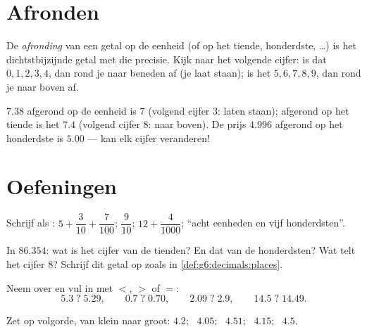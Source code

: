 \section{Afronden}

\begin{definition}[Afronden]\label{def:g6:decimals:rounding}
De \emph{afronding} van een getal op de eenheid (of op het
tiende, honderdste, \dots) is het dichtstbijzijnde getal met die precisie.
Kijk naar het volgende cijfer: is dat $0,1,2,3,4$, dan rond je naar beneden
af (je laat staan); is het $5,6,7,8,9$, dan rond je naar boven af.
\end{definition}

\begin{example}
$7.38$ afgerond op de eenheid is $7$ (volgend cijfer $3$: laten staan);
afgerond op het tiende is het $7.4$ (volgend cijfer $8$: naar boven). De prijs
$4.996$ afgerond op het honderdste is $5.00$ ---  kan elk cijfer
veranderen!
\end{example}

\section{Oefeningen}

\begin{exercise}[$\star$]\label{exo:g6:decimals:1}
Schrijf als : $5 + \dfrac{3}{10} + \dfrac{7}{100}$;
\quad $\dfrac{9}{10}$; \quad $12 + \dfrac{4}{1000}$;
\quad ``acht eenheden en vijf honderdsten''.
\end{exercise}

\begin{exercise}[$\star$]\label{exo:g6:decimals:2}
In $86.354$: wat is het cijfer van de tienden? En dat van de honderdsten? Wat
telt het cijfer $8$? Schrijf dit getal op zoals in
\cref{def:g6:decimals:places}.
\end{exercise}

\begin{exercise}[$\star$]\label{exo:g6:decimals:3}
Neem over en vul in met $<$, $>$ of $=$:
\[
5.3 \;?\; 5.29, \qquad
0.7 \;?\; 0.70, \qquad
2.09 \;?\; 2.9, \qquad
14.5 \;?\; 14.49 .
\]
\end{exercise}

\begin{exercise}[$\star$]\label{exo:g6:decimals:4}
Zet op volgorde, van klein naar groot:
$4.2$; \ $4.05$; \ $4.51$; \ $4.15$; \ $4.5$.
\end{exercise}

